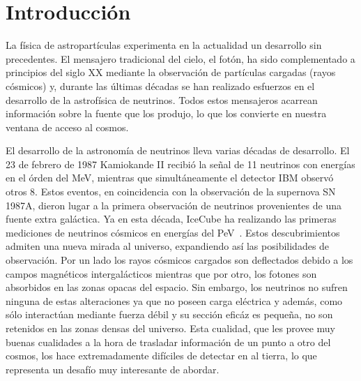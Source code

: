 \chapter{Introducci\'on}
\label{ch:intro}

La f\'isica de astropart\'iculas experimenta en la actualidad un desarrollo sin precedentes. 
El mensajero tradicional del cielo, el fot\'on, ha sido complementado a principios del siglo XX mediante la observaci\'on de part\'iculas cargadas (rayos c\'osmicos) y, durante las \'ultimas d\'ecadas se han realizado esfuerzos en el desarrollo de la astrof\'isica de neutrinos.
Todos estos mensajeros acarrean informaci\'on sobre la fuente que los produjo, lo que los convierte en nuestra ventana de acceso al cosmos.

El desarrollo de la astronom\'ia de neutrinos lleva varias d\'ecadas de desarrollo. 
El 23 de febrero de 1987 Kamiokande II recibi\'o la se\~nal de 11 neutrinos con energ\'ias en el \'orden del MeV, mientras que simult\'aneamente el detector IBM observ\'o otros 8.
Estos eventos, en coincidencia con la observaci\'on de la supernova SN 1987A, dieron lugar a la primera observaci\'on de neutrinos provenientes de una fuente extra gal\'actica.
Ya en esta d\'ecada, IceCube ha realizando las primeras mediciones de neutrinos c\'osmicos en energ\'ias del PeV~\cite{cite:IceCube1}.
Estos descubrimientos admiten una nueva mirada al universo, expandiendo as\'i las posibilidades de observaci\'on.
Por un lado los rayos c\'osmicos cargados son deflectados debido a los campos magn\'eticos intergal\'acticos mientras que por otro, los fotones son absorbidos en las zonas opacas del espacio. 
Sin embargo, los neutrinos no sufren ninguna de estas alteraciones ya que no poseen carga el\'ectrica y adem\'as, como s\'olo interact\'uan mediante fuerza d\'ebil y su secci\'on efic\'az es peque\~na, no son retenidos en las zonas densas del universo.
Esta cualidad, que les provee muy buenas cualidades a la hora de trasladar informaci\'on de un punto a otro del cosmos, los hace extremadamente dif\'iciles de detectar en al tierra, lo que representa un desaf\'io muy interesante de abordar.

